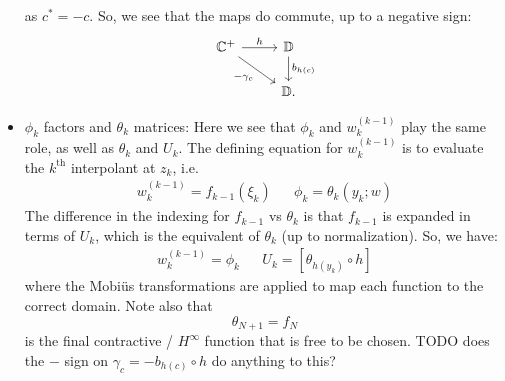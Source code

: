 \begin{itemize}
    as $c^* = -c$. So, we see that the maps do commute, up to a negative sign:
    \begin{equation}\begin{tikzcd}
    	\mathbb C^+ \arrow[r, "h"] \arrow[dr, "-\gamma_{c}"'] & \mathbb D\arrow[d, "b_{h(c)}"] \\
    	& \mathbb D.
    \end{tikzcd}\end{equation}

    \item $\phi_k$ factors and $\theta_k$ matrices: Here we see that $\phi_k$ and $w_k^{(k-1)}$ play the same role, as well as $\theta_k$ and $U_k$. The defining equation for $w_k^{(k-1)}$ is to evaluate the $k^\mathrm{th}$ interpolant at $z_k$, i.e.
    \begin{align}
        w_k^{(k-1)} = f_{k-1}(\xi_k) && \phi_k = \theta_k(y_k; w)
    \end{align}
    The difference in the indexing for $f_{k-1}$ vs $\theta_k$ is that $f_{k-1}$ is expanded in terms of $U_k$, which is the equivalent of $\theta_k$ (up to normalization). So, we have:
    \begin{align}
        w_k^{(k-1)} = \phi_k && U_k = [\theta_{h(y_k)}\circ h]
        \label{eq:phik_wk_corr}
    \end{align}
    where the Mobi\"us transformations are applied to map each function to the correct domain. Note also that
    \begin{equation}
        \theta_{N+1} = f_N
    \end{equation}
    is the final contractive / $H^\infty$ function that is free to be chosen. 
    {\color{red}TODO does the $-$ sign on $\gamma_c = -b_{h(c)}\circ h$ do anything to this?}
    

\end{itemize}
